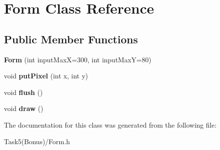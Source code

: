 \section{Form Class Reference}
\label{class_form}
\subsection*{Public Member Functions}
\begin{DoxyCompactItemize}
\item 
{\bfseries Form} (int input\+Max\+X=300, int input\+Max\+Y=80)\label{class_form_a8e9f65a9142bbecab40c051e2bff4abd}

\item 
void {\bfseries put\+Pixel} (int x, int y)\label{class_form_a56e8191b44ccfdf4e359bb06a6bfc6b5}

\item 
void {\bfseries flush} ()\label{class_form_aaa97c970662093c0936889a5b70b8f04}

\item 
void {\bfseries draw} ()\label{class_form_af2fa46ab3deb4e858bb681e6523a381d}

\end{DoxyCompactItemize}


The documentation for this class was generated from the following file\+:\begin{DoxyCompactItemize}
\item 
Task5(\+Bonus)/Form.\+h\end{DoxyCompactItemize}
